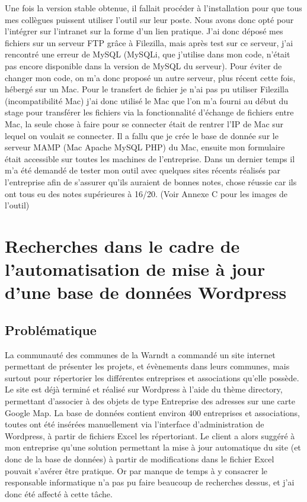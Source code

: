 \documentclass[report]{tnreport}
\begin{document}
Une fois la version stable obtenue, il fallait procéder à l’installation pour que tous mes collègues puissent utiliser l’outil sur leur poste. Nous avons donc opté pour l’intégrer sur l’intranet sur la forme d’un lien pratique. J’ai donc déposé mes fichiers sur un serveur FTP grâce à Filezilla, mais après test sur ce serveur, j’ai rencontré une erreur de MySQL (MySQLi, que j’utilise dans mon code, n’était pas encore disponible dans la version de MySQL du serveur). Pour éviter de changer mon code, on m’a donc proposé un autre serveur, plus récent cette fois, hébergé sur un Mac. Pour le transfert de fichier je n’ai pas pu utiliser Filezilla (incompatibilité Mac) j’ai donc utilisé le Mac que l’on m’a fourni au début du stage pour transférer les fichiers via la fonctionnalité d’échange de fichiers entre Mac, la seule chose à faire pour se connecter était de rentrer l’IP de Mac sur lequel on voulait se connecter. Il a fallu que je crée le base de donnée sur le serveur MAMP (Mac Apache MySQL PHP) du Mac, ensuite mon formulaire était accessible sur toutes les machines de l’entreprise. Dans un dernier temps il m’a été demandé de tester mon outil avec quelques sites récents réalisés par l’entreprise afin de s’assurer qu’ils auraient de bonnes notes, chose réussie car ils ont tous eu des notes supérieures à 16/20. (Voir Annexe C pour les images de l'outil)



\chapter{Recherches dans le cadre de l’automatisation de mise à jour d’une base de données Wordpress}

\section{Problématique}
La communauté des communes de la Warndt a commandé un site internet permettant de présenter les projets, et évènements dans leurs communes, mais surtout pour répertorier les différentes entreprises et associations qu’elle possède. Le site est déjà terminé et réalisé sur Wordpress à l’aide du thème directory, permettant d’associer à des objets de type Entreprise des adresses sur une carte Google Map. La base de données contient environ 400 entreprises et associations, toutes ont été insérées manuellement via l’interface d’administration de Wordpress, à partir de fichiers Excel les répertoriant. Le client a alors suggéré à mon entreprise qu’une solution permettant la mise à jour automatique du site (et donc de la base de données) à partir de modifications dans le fichier Excel pouvait s'avérer être pratique. Or par manque de temps à y consacrer le responsable informatique n’a pas pu faire beaucoup de recherches dessus, et j’ai donc été affecté à cette tâche.
\end{document}
